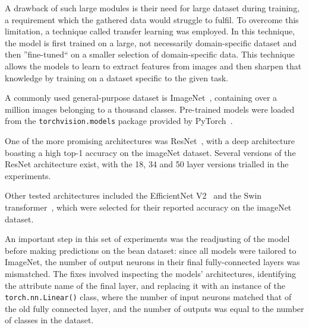 A drawback of such large modules is their need for large dataset during training, a requirement which the gathered data would
struggle to fulfil.
To overcome this limitation, a technique called transfer learning was employed.
In this technique, the model is first trained on a large, not necessarily domain-specific dataset and then
''fine-tuned`` on a smaller selection of domain-specific data.
This technique allows the models to learn to extract features from images and then sharpen that knowledge by training on a dataset
specific to the given task.

A commonly used general-purpose dataset is ImageNet~\cite{imageNet}, containing over a million images belonging to a thousand
classes.
Pre-trained models were loaded from the \verb|torchvision.models| package provided by PyTorch~\cite{pytorchLibrary}.

One of the more promising architectures was ResNet~\cite{resNet}, with a deep architecture boasting a high top-1 accuracy on the imageNet dataset.
Several versions of the ResNet architecture exist, with the 18, 34 and 50 layer versions trialled in the experiments.

Other tested architectures included the EfficientNet V2~\cite{efficientNet} and the Swin transformer~\cite{swinTransformer},
which were selected for their reported accuracy on the imageNet dataset.

An important step in this set of experiments was the readjusting of the model before making predictions on the bean dataset:
since all models were tailored to ImageNet, the number of output neurons in their final fully-connected layers was mismatched.
The fixes involved inspecting the models' architectures, identifying the attribute name of the final layer, and replacing it with an
instance of the \verb|torch.nn.Linear()| class, where the number of input neurons matched that of the old fully connected layer,
and the number of outputs was equal to the number of classes in the dataset.